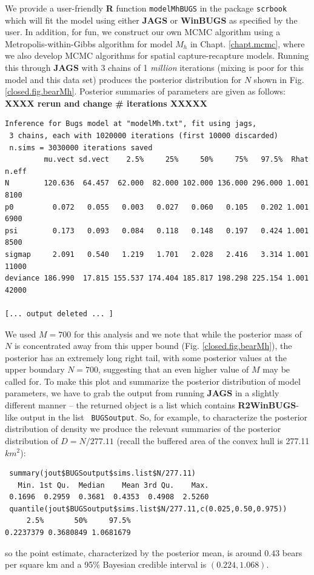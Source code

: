 We provide a user-friendly {\bf R}
function \mbox{\tt modelMhBUGS} in the package \mbox{\tt scrbook} which will
fit the model using either {\bf JAGS} or {\bf WinBUGS} as specified by
the user.
In addition, for fun, we construct our own MCMC algorithm using a
Metropolis-within-Gibbs algorithm
for model $M_{h}$ in Chapt. \ref{chapt.mcmc}, where we
also develop MCMC  algorithms for spatial capture-recapture models.
Running this through {\bf JAGS} with 3 chains of 1 {\it million} iterations 
(mixing is poor for this model and this data set) produces the posterior distribution for $N$ shown
in Fig. \ref{closed.fig.bearMh}. Posterior summaries of parameters are
given as follows: {\bf XXXX rerun and change \# iterations XXXXX}
{\small
\begin{verbatim}
Inference for Bugs model at "modelMh.txt", fit using jags,
 3 chains, each with 1020000 iterations (first 10000 discarded)
 n.sims = 3030000 iterations saved
         mu.vect sd.vect    2.5%     25%     50%     75%   97.5%  Rhat n.eff
N        120.636  64.457  62.000  82.000 102.000 136.000 296.000 1.001  8100
p0         0.072   0.055   0.003   0.027   0.060   0.105   0.202 1.001  6900
psi        0.173   0.093   0.084   0.118   0.148   0.197   0.424 1.001  8500
sigmap     2.091   0.540   1.219   1.701   2.028   2.416   3.314 1.001 11000
deviance 186.990  17.815 155.537 174.404 185.817 198.298 225.154 1.001 42000

[... output deleted ... ]
\end{verbatim}
}

We used $M=700$ for this analysis and we
note that  while the posterior mass of $N$ is concentrated away from this
upper bound (Fig. \ref{closed.fig.bearMh}), the posterior has an
extremely long right tail, with some posterior values at the upper
boundary $N=700$, suggesting that an even higher value of $M$ may be
called for. To make this plot and summarize the posterior distribution
of model parameters, we have to grab the output from running {\bf
  JAGS} in a slightly different manner -- the returned object is a
list which contains {\bf R2WinBUGS}-like output in the list \mbox{\tt
  BUGSoutput}.
So, for example, 
to characterize the posterior distribution of density we produce the
relevant summaries of the posterior distribution of $D  = N/277.11$
(recall 
the buffered area of the convex hull is 277.11 $km^2$):
{\small
\begin{verbatim}
 summary(jout$BUGSoutput$sims.list$N/277.11)
   Min. 1st Qu.  Median    Mean 3rd Qu.    Max. 
 0.1696  0.2959  0.3681  0.4353  0.4908  2.5260 
 quantile(jout$BUGSoutput$sims.list$N/277.11,c(0.025,0.50,0.975))
     2.5%       50%     97.5% 
0.2237379 0.3680849 1.0681679 
\end{verbatim}
}
so the point estimate, characterized by the posterior mean, is around
$0.43$ bears per square km and a 95\% Bayesian credible interval is
$(0.224, 1.068)$.

